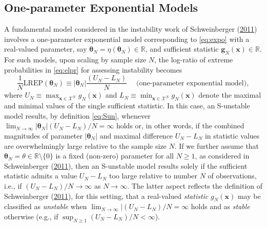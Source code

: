 \documentclass[]{article}
\theoremstyle{definition}
\newcommand{\REP}{\mathrm{LREP}}
\begin{document}
\subsection{One-parameter Exponential Models}\label{one-param-exp}

A fundamental model considered in the instability work of Schweinberger
(\protect\hyperlink{ref-schweinberger2011instability}{2011}) involves a
one-parameter exponential model corresponding to \eqref{eq:expo} with a
real-valued parameter, say
\(\boldsymbol \theta_N = \eta(\boldsymbol \theta_N)\in \mathbb{R}\), and
sufficient statistic \(\boldsymbol g_N(\boldsymbol x)\in \mathbb{R}\).
For such models, upon scaling by sample size \(N\), the log-ratio of
extreme probabilities in \eqref{eq:elpr} for assessing instability becomes
\begin{equation}
\label{eq:UL}
\frac{1}{N}\REP(\boldsymbol \theta_N ) \equiv   |\boldsymbol \theta_N| \frac{(U_N-L_N)}{N} \;\quad \mbox{(one-parameter exponential model)},
\end{equation}
where
\(U_N \equiv \max_{\boldsymbol x\in\mathcal{X}^N}g_N(\boldsymbol x)\)
and
\(L_N \equiv \min_{\boldsymbol x\in\mathcal{X}^N}g_N(\boldsymbol x)\)
denote the maximal and minimal values of the single sufficient
statistic. In this case, an S-unstable model results, by definition
\eqref{eq:Sun}, whenever
\(\lim_{N\to \infty} |\boldsymbol \theta_N| (U_N-L_N)/N= \infty\) holds
or, in other words, if the combined magnitudes of parameter
\(|\boldsymbol \theta_N|\) and maximal difference \(U_N-L_N\) in
statistic values are overwhelmingly large relative to the sample size
\(N\). If we further assume that
\(\boldsymbol \theta_N =\theta\in\mathbb{R}\setminus \{0\}\) is a fixed
(non-zero) parameter for all \(N \geq 1\), as considered in
Schweinberger
(\protect\hyperlink{ref-schweinberger2011instability}{2011}), then an
S-unstable model results solely if the sufficient statistic admits a
value \(U_N-L_N\) too large relative to number \(N\) of observations,
i.e., if \((U_N-L_N)/N\to \infty\) as \(N\to \infty\). The latter aspect
reflects the definition of Schweinberger
(\protect\hyperlink{ref-schweinberger2011instability}{2011}), for this
setting, that a real-valued \emph{statistic} \(g_N(\boldsymbol x)\) may
be classified as \emph{unstable} when
\(\lim_{N\to \infty}|(U_N-L_N)/N=\infty\) holds and as \emph{stable}
otherwise (e.g., if \(\sup_{N \geq 1}(U_N-L_N)/N<\infty\)).
\end{document}
